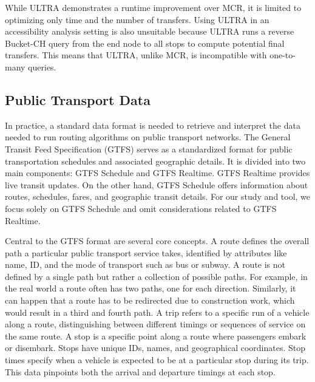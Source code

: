 While ULTRA demonstrates a runtime improvement over MCR, it is limited to optimizing only time and the number of transfers.
Using ULTRA in an accessibility analysis setting is also unsuitable because ULTRA runs a reverse Bucket-CH query from the end node to all stops to compute potential final transfers.
This means that ULTRA, unlike MCR, is incompatible with one-to-many queries.







\subsection{Public Transport Data}
\label{subsec:public_transport_data}

In practice, a standard data format is needed to retrieve and interpret the data needed to run routing algorithms on public transport networks.
The General Transit Feed Specification (GTFS)  serves as a standardized format for public transportation schedules and associated geographic details.
It is divided into two main components: GTFS Schedule and GTFS Realtime.
GTFS Realtime provides live transit updates.
On the other hand, GTFS Schedule offers information about routes, schedules, fares, and geographic transit details.
For our study and tool, we focus solely on GTFS Schedule and omit considerations related to GTFS Realtime.

Central to the GTFS format are several core concepts.
A route defines the overall path a particular public transport service takes, identified by attributes like name, ID, and the mode of transport such as bus or subway.
A route is not defined by a single path but rather a collection of possible paths.
For example, in the real world a route often has two paths, one for each direction.
Similarly, it can happen that a route has to be redirected due to construction work, which would result in a third and fourth path.
A trip refers to a specific run of a vehicle along a route, distinguishing between different timings or sequences of service on the same route.
A stop is a specific point along a route where passengers embark or disembark.
Stops have unique IDs, names, and geographical coordinates.
Stop times specify when a vehicle is expected to be at a particular stop during its trip.
This data pinpoints both the arrival and departure timings at each stop.

